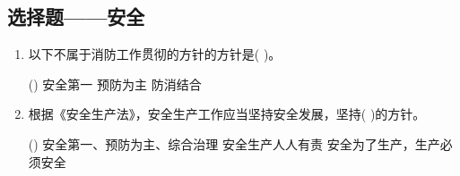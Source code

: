 		\subsection{选择题——安全}
		\begin{enumerate}
			\kaishu
			\item 以下不属于消防工作贯彻的方针的方针是( )。
				\begin{tasks}(\choosenum)
					\task	安全第一
					\task	预防为主
					\task   防消结合
				\end{tasks} 

			\item 根据《安全生产法》，安全生产工作应当坚持安全发展，坚持( )的方针。
				\begin{tasks}(\choosenum)
					\task	安全第一、预防为主、综合治理
					\task	安全生产人人有责
					\task   安全为了生产，生产必须安全
				\end{tasks} 
		\end{enumerate}
				


































